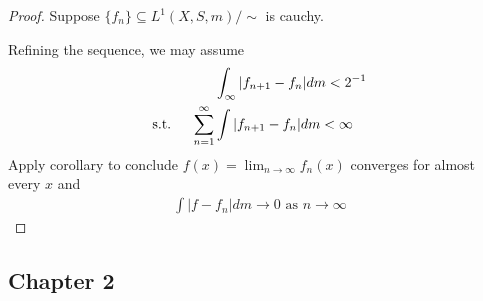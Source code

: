 \begin{proof}
	Suppose $\{f_n\} \subseteq L^{1}(X,S, m) / \sim$ is cauchy.

	Refining the sequence, we may assume 
	\begin{align*}
	&\int_{\infty}|f_{n+1} - f_{n} | dm < 2^{-1} \\ \text{s.t. \quad}
		\sum_{n=1}^{\infty} &\int | f_{n+1} - f_{n} | dm < \infty
	\end{align*} 
	Apply corollary to conclude $f(x) = \lim_{n \to \infty} f_{n}(x)$ converges for almost every $x$ and 
	\begin{align*}
		\int |f - f_{n} | dm \to 0 \text{ as } n \to \infty
	\end{align*} 
\end{proof}


\subsection{Chapter 2}


